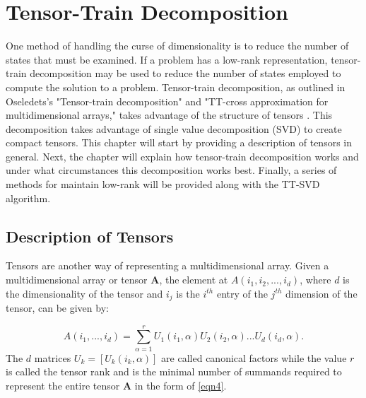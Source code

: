 \chapter{Tensor-Train Decomposition}\label{chp:TT}

One method of handling the curse of dimensionality is to reduce the number of states that must be examined. If a problem has a low-rank representation, tensor-train decomposition may be used to reduce the number of states employed to compute the solution to a problem. Tensor-train decomposition, as outlined in Oseledets's "Tensor-train decomposition" and "TT-cross approximation for multidimensional arrays," takes advantage of the structure of tensors \cite{Osel1,Osel2}. This decomposition takes advantage of single value decomposition (SVD) to create compact tensors. This chapter will start by providing a description of tensors in general. Next, the chapter will explain how tensor-train decomposition works and under what circumstances this decomposition works best. Finally, a series of methods for maintain low-rank will be provided along with the TT-SVD algorithm.

\section{Description of Tensors}
Tensors are another way of representing a multidimensional array. Given a multidimensional array or tensor \textbf{A}, the element at $A(i_1,i_2,...,i_d)$, where $d$ is the dimensionality of the tensor and $i_j$ is the $i^{th}$ entry of the $j^{th}$ dimension of the tensor, can be given by:

\begin{equation}\label{eqn4}
A(i_1,...,i_d) = \sum_{\alpha=1}^{r}U_1(i_1,\alpha)U_2(i_2,\alpha)...U_d(i_d,\alpha).
\end{equation}
The $d$ matrices $U_k = [U_k(i_k,\alpha)]$ are called canonical factors while the value $r$ is called the tensor rank and is the minimal number of summands required to represent the entire tensor \textbf{A} in the form of \ref{eqn4}. \cite{Osel1}

